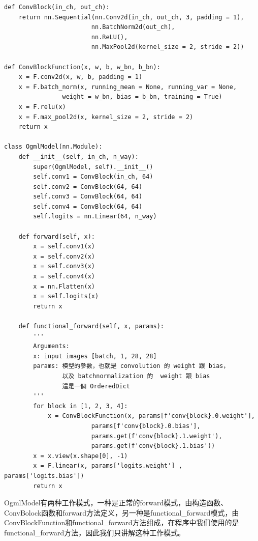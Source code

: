 \begin{lstlisting}
def ConvBlock(in_ch, out_ch):
    return nn.Sequential(nn.Conv2d(in_ch, out_ch, 3, padding = 1),
                        nn.BatchNorm2d(out_ch),
                        nn.ReLU(),
                        nn.MaxPool2d(kernel_size = 2, stride = 2))

def ConvBlockFunction(x, w, b, w_bn, b_bn):
    x = F.conv2d(x, w, b, padding = 1)
    x = F.batch_norm(x, running_mean = None, running_var = None, 
                weight = w_bn, bias = b_bn, training = True)
    x = F.relu(x)
    x = F.max_pool2d(x, kernel_size = 2, stride = 2)
    return x

class OgmlModel(nn.Module):
    def __init__(self, in_ch, n_way):
        super(OgmlModel, self).__init__()
        self.conv1 = ConvBlock(in_ch, 64)
        self.conv2 = ConvBlock(64, 64)
        self.conv3 = ConvBlock(64, 64)
        self.conv4 = ConvBlock(64, 64)
        self.logits = nn.Linear(64, n_way)
    
    def forward(self, x):
        x = self.conv1(x)
        x = self.conv2(x)
        x = self.conv3(x)
        x = self.conv4(x)
        x = nn.Flatten(x)
        x = self.logits(x)
        return x

    def functional_forward(self, x, params):
        '''
        Arguments:
        x: input images [batch, 1, 28, 28]
        params: 模型的參數，也就是 convolution 的 weight 跟 bias，
                以及 batchnormalization 的  weight 跟 bias
                這是一個 OrderedDict
        '''
        for block in [1, 2, 3, 4]:
            x = ConvBlockFunction(x, params[f'conv{block}.0.weight'], 
                        params[f'conv{block}.0.bias'],                                 
                        params.get(f'conv{block}.1.weight'), 
                        params.get(f'conv{block}.1.bias'))
        x = x.view(x.shape[0], -1)
        x = F.linear(x, params['logits.weight'] , params['logits.bias'])
        return x
\end{lstlisting}
OgmlModel有两种工作模式，一种是正常的forward模式，由构造函数、ConvBolock函数和forward方法定义，另一种是functional\_forward模式，由ConvBlockFunction和functional\_forward方法组成，在程序中我们使用的是functional\_forward方法，因此我们只讲解这种工作模式。
